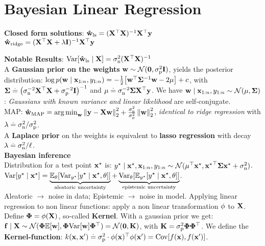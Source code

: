 \section{Bayesian Linear Regression}
\begin{framed}
    \textbf{Closed form solutions}:
    $\vwhat_{\ls} = \inv{(\transpose{\mX} \mX)} \transpose{\mX} \vy$  \\
    $\vwhat_{\ridge} = \inv{(\transpose{\mX} \mX + \lambda \mI)} \transpose{\mX} \vy$
\end{framed}
\textbf{Notable Results}: $\Var{\vwhat_{\ls} \mid \rX} = \sigman^2(\transpose{\rX}\rX)^{-1}$ \\
A \textbf{Gaussian prior on the weights} $\vw \sim \N{\vzero}{\sigmap^2 \mI}$, yields the posterior distribution: $\log p(\vw \mid \vx_{1:n}, y_{1:n}) = -\frac{1}{2} \brackets*{\transpose{\vw}\mSigma^{-1}\vw - 2\vmu} + c$,
with $\mSigma \defeq \inv{\parentheses*{\sigman^{-2} \transpose{\mX} \mX + \sigmap^{-2} \mI}}$ and $\vmu \defeq \sigman^{-2} \mSigma \transpose{\mX} \vy$. 
We have $\vw \mid \vx_{1:n}, y_{1:n} \sim \N{\vmu}{\mSigma}$: \textit{Gaussians with known variance and linear likelihood} are self-conjugate. \\
MAP: $\vwhat_\MAP = \argmin_\vw \norm{\vy - \mX \vw}_2^2 + \frac{\sigman^2}{\sigmap^2} \norm{\vw}_2^2$, \textit{identical to ridge regression} with $\lambda \defeq \sigman^2 / \sigmap^2$. \\
A \textbf{Laplace prior} on the weights is equivalent to \textbf{lasso regression} with decay ${\lambda \defeq \sigman^2 / \ell}$. \\
\textbf{Bayesian inference} \\
Distribution for a test point $\vxs$ is: $\ys \mid \vxs, \vx_{1:n}, y_{1:n} \sim \N{\transpose{\vmu} \vxs}{\transpose{\vxs} \mSigma \vxs + \sigman^2}$. \\
$\Var{\ys \mid \vxs} = \underbrace{\E[\vtheta]{\Var[\ys]{\ys \mid \vxs, \vtheta}}}_{\text{aleatoric uncertainty}} + \underbrace{\Var[\vtheta]{\E[\ys]{\ys \mid \vxs, \vtheta}}}_{\text{epistemic uncertainty}}$.\\
Aleatoric $\rightarrow$ noise in data; Epistemic $\rightarrow$ noise in model.
Applying linear regression to non linear functions: apply a non linear transformation $\vphi$ to $\rX$. Define $\mPhi = \vphi(\rX)$, so-called \textbf{Kernel}. With a gaussian prior we get: $\vf \mid \mX \sim \N{\mPhi \E{\vw}}{\mPhi \Var{\vw} \transpose{\mPhi}} = \N{\vzero}{\mK}$, with $\mK = \sigmap^2 \mPhi \transpose{\mPhi}$. We define the \textbf{Kernel-function}: $k(\vx, \vxp) \defeq \sigmap^2 \cdot \transpose{\vphi(\vx)} \vphi(\vxp) = \Cov{f(\vx), f(\vxp)}$.
